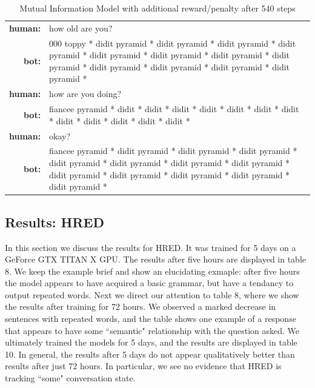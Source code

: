 \documentclass[letterpaper]{article}
\begin{document}
\begin{table}[bt!]
    \centering
    \small
    \caption{\small Mutual Information Model with additional reward/penalty after 540 steps}
    \begin{tabularx}{0.48\textwidth}{rX}
        \hline \hline
        \textbf{human:} & how old are you?    \\
        \textbf{bot:} & 000 toppy * didit pyramid * didit pyramid * didit pyramid * didit pyramid * didit pyramid * didit pyramid * didit pyramid * didit pyramid * didit pyramid * didit pyramid * didit pyramid * didit pyramid *\\
        \textbf{human:} & how are you doing? \\
        \textbf{bot:} & fiancee pyramid * didit * didit * didit * didit * didit * didit * didit * didit * didit * didit * didit * didit *\\
        \textbf{human:} & okay? \\
        \textbf{bot:} & fiancee pyramid * didit pyramid * didit pyramid * didit pyramid * didit pyramid * didit pyramid * didit pyramid * didit pyramid * didit pyramid * didit pyramid * didit pyramid * didit pyramid * didit pyramid * \\
        \hline \hline    
    \end{tabularx}
    \label{table:mi_03}
\end{table}


\subsection{Results: HRED}

In this section we discuss the results for HRED. It was trained for 5 days on a GeForce GTX TITAN X GPU. The results after five hours are displayed in table 8. We keep the example brief and show an elucidating exmaple: after five hours the model appears to have acquired a basic grammar, but have a tendancy to output repeated words. Next we direct our attention to table 8, where we show the results after training for 72 hours. We observed a marked decrease in sentences with repeated words, and the table shows one example of a response that appears to have some ``semantic" relationship with the question asked. We ultimately trained the models for 5 days, and the results are displayed in table 10. In general, the results after 5 days do not appear qualitatively better than results after just 72 hours. In particular, we see no evidence that HRED is tracking ``some" conversation state. 
\end{document}

